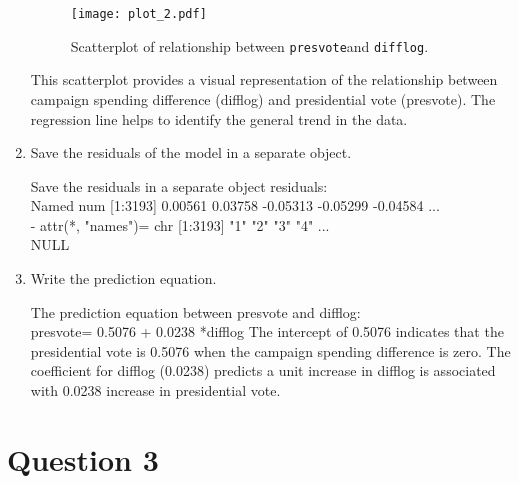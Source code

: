 \documentclass[12pt,letterpaper]{article}
\begin{document}
\begin{enumerate}
\begin{figure}[h!]
			\caption{\footnotesize Scatterplot of relationship between \texttt{presvote}and \texttt{difflog}.}
			\label{fig:plot_2}
			\texttt{[image: plot\_2.pdf]}
		\end{figure}
		\noindent This scatterplot provides a visual representation of the relationship between campaign spending difference (difflog) and presidential vote (presvote). The regression line helps to identify the general trend in the data. 
		\item Save the residuals of the model in a separate object.	
		\vspace{.15cm}
		 
		\vspace{.15cm}
		\noindent Save the residuals in a separate object residuals:\\
		Named num [1:3193] 0.00561 0.03758 -0.05313 -0.05299 -0.04584 ...\\
		- attr(*, "names")= chr [1:3193] "1" "2" "3" "4" ...\\
		NULL
		\item Write the prediction equation.
		
		\vspace{.15cm}
		 
		\vspace{.15cm}
		\noindent The prediction equation between presvote and difflog:\\
		presvote= 0.5076 + 0.0238 *difflog
		\noindent The intercept of 0.5076 indicates that the presidential vote is 0.5076 when the campaign spending difference is zero. 
		The coefficient for difflog (0.0238) predicts a unit increase in difflog is associated with 0.0238 increase in presidential vote.
	\end{enumerate}
	
\vspace{.5cm}
\section*{Question 3}
\end{document}

